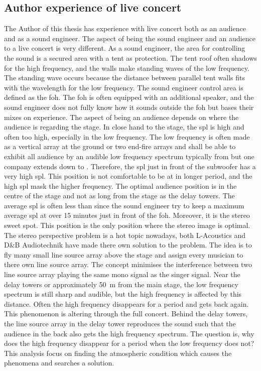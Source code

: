 \subsection{Author experience of live concert}\label{sec:ana:aut_exp_con}
The Author of this thesis has experience with live concert both as an audience and as a sound engineer. The aspect of being the sound engineer and an audience to a live concert is very different. As a sound engineer, the area for controlling the sound is a secured area with a tent as protection. The tent roof often shadows for the high frequency, and the walls make standing waves of the low frequency.  The standing wave occurs because the distance between parallel tent walls fits with the wavelength for the low frequency. The sound engineer control area is defined as the \gls{foh}. The \gls{foh} is often equipped with an additional speaker, and the sound engineer does not fully know how it sounds outside the \gls{foh} but bases their mixes on experience. The aspect of being an audience depends on where the audience is regarding the stage. In close hand to the stage, the \gls{spl} is high and often too high, especially in the low frequency. The low frequency is often made as a vertical array at the ground or two end-fire arrays and shall be able to exhibit all audience by an audible low frequency spectrum typically from  but one company extends down to . Therefore, the \gls{spl} just in front of the subwoofer has a very high \gls{spl}. This position is not comfortable to be at in longer period, and the high \gls{spl} mask the higher frequency. The optimal audience position is in the centre of the stage and not as long from the stage as the delay towers. The average \gls{spl} is often less than  since the sound engineer try to keep a maximum average \gls{spl} at  over 15 minutes just in front of the \gls{foh}. Moreover, it is the stereo sweet spot. This position is the only position where the stereo image is optimal. The stereo perspective problem is a hot topic nowadays, both L-Acoustics \citep{l_acoustics_l_isa} and D\&B Audiotechnik \citep{dbsoundscape} have made there own solution to the problem. The idea is to fly many small line source array above the stage and assign every musician to there own line source array. The concept minimises the interference between two line source array playing the same mono signal as the singer signal. 
Near the delay towers or approximately \SI{50}{\meter} from the main stage, the low frequency spectrum is still sharp and audible, but the high frequency is affected by this distance. Often the high frequency disappears for a period and gets back again. This phenomenon is altering through the full concert. Behind the delay towers, the line source array in the delay tower reproduces the sound such that the audience in the back also gets the high frequency spectrum. The question is, why does the high frequency disappear for a period when the low frequency does not? This analysis focus on finding the atmospheric condition which causes the phenomena and searches a solution.


 
